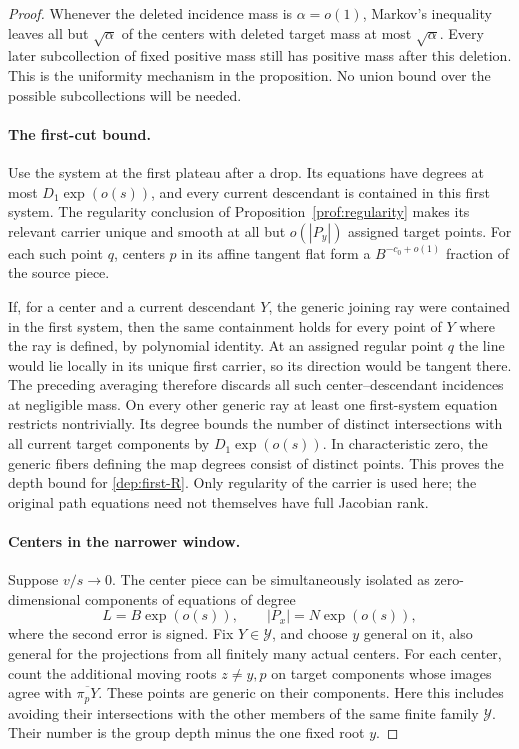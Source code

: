 \begin{proof}
Whenever the deleted incidence mass is $\alpha=o(1)$, Markov's
inequality leaves all but $\sqrt\alpha$ of the centers with deleted
target mass at most $\sqrt\alpha$. Every later subcollection of
fixed positive mass still has positive mass after this deletion.
This is the uniformity mechanism in the proposition. No union bound
over the possible subcollections will be needed.

\paragraph{The first-cut bound.}
Use the system at the first plateau after a drop. Its equations have
degrees at most $D_1\exp(o(s))$, and every current descendant is
contained in this first system. The regularity conclusion of
Proposition~\ref{prof:regularity} makes its relevant carrier unique
and smooth at all but $o(|P_y|)$ assigned target points. For each such
point $q$, centers $p$ in its affine tangent flat form a
$B^{-c_0+o(1)}$ fraction of the source piece.

If, for a center and a current descendant $Y$, the generic joining ray
were contained in the first system, then the same containment holds
for every point of $Y$ where the ray is defined, by polynomial
identity. At an assigned regular point $q$ the line would lie locally
in its unique first carrier, so its direction would be tangent there.
The preceding averaging therefore discards all such
center--descendant incidences at negligible mass. On every other
generic ray at least one first-system equation restricts nontrivially.
Its degree bounds the number of distinct intersections with all
current target components by $D_1\exp(o(s))$. In characteristic zero,
the generic fibers defining the map degrees consist of distinct
points. This proves the depth bound for \eqref{dep:first-R}.
Only regularity of the carrier is used here; the original path
equations need not themselves have full Jacobian rank.

\paragraph{Centers in the narrower window.}
Suppose $v/s\to0$. The center piece can be simultaneously isolated as
zero-dimensional components of equations of degree
\[
 L=B\exp(o(s)),\qquad |P_x|=N\exp(o(s)),
\]
where the second error is signed. Fix $Y\in\mathcal Y$, and choose
$y$ general on it, also general for the projections from all finitely
many actual centers. For each center, count the additional moving
roots $z\ne y,p$ on target components whose images agree with
$\overline{\pi_pY}$. These points are generic on their components.
Here this includes avoiding their intersections with the other members
of the same finite family $\mathcal Y$. Their number is the group
depth minus the one fixed root $y$.


\end{proof}
